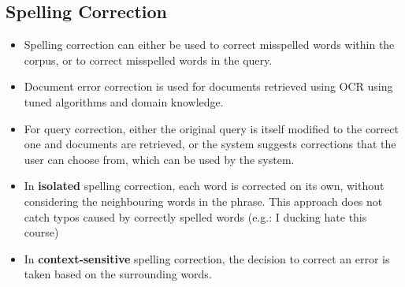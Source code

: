 \documentclass{article}
\begin{document}
\subsection{Spelling Correction}
\begin{itemize}
    \item Spelling correction can either be used to correct misspelled words within the corpus, or to correct misspelled words in the query.
    
    \item Document error correction is used for documents retrieved using OCR using tuned algorithms and domain knowledge. 
    
    \item For query correction, either the original query is itself modified to the correct one and documents are retrieved, or the system suggests corrections that the user can choose from, which can be used by the system. 
    
    \item In \textbf{isolated} spelling correction, each word is corrected on its own, without considering the neighbouring words in the phrase. This approach does not catch typos caused by correctly spelled words (e.g.: I ducking hate this course)
    
    \item In \textbf{context-sensitive} spelling correction, the decision to correct an error is taken based on the surrounding words. 
\end{itemize}
\end{document}
